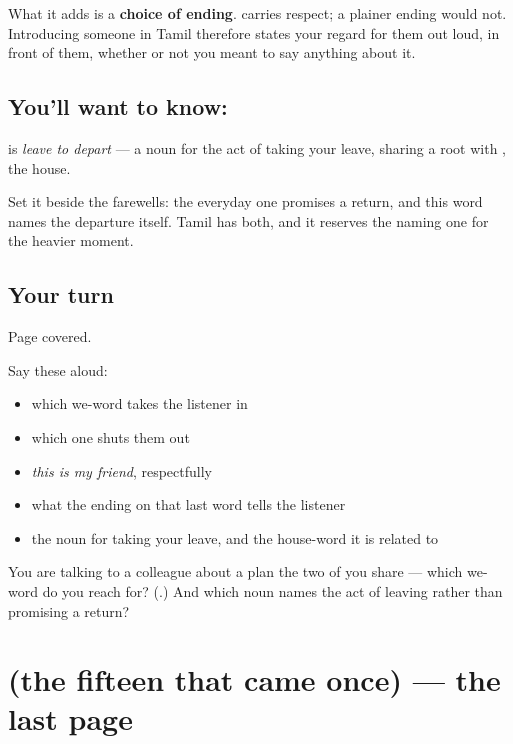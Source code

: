 What it adds is a \textbf{choice of ending}. \textbf{} carries respect; a plainer ending would not. Introducing someone in Tamil therefore states your regard for them out loud, in front of them, whether or not you meant to say anything about it.

\subsection*{You'll want to know: }
\textbf{} is \emph{leave to depart} — a noun for the act of taking your leave, sharing a root with \textbf{}, the house.

Set it beside the farewells: the everyday one promises a return, and this word names the departure itself. Tamil has both, and it reserves the naming one for the heavier moment.

\subsection*{Your turn}
Page covered.

Say these aloud:

\begin{itemize}
\raggedright
  \item which we-word takes the listener in
  \item which one shuts them out
  \item \emph{this is my friend}, respectfully
  \item what the ending on that last word tells the listener
  \item the noun for taking your leave, and the house-word it is related to
\end{itemize}

\begin{tcolorbox}[breakable,colback=teal!4,colframe=teal!35!black,title={Before you move on}]
You are talking to a colleague about a plan the two of you share — which we-word do you reach for? (\textbf{}.) And which noun names the act of leaving rather than promising a return?
\end{tcolorbox}
\section[(the fifteen that came once)]{(the fifteen that came once) — the last page}

\label{lesson:TA-R86-the-last-page}



